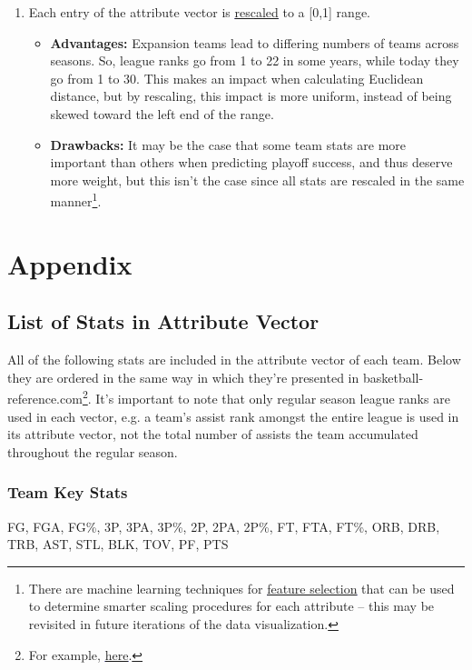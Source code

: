 \documentclass[a4paper,11pt]{article}
\begin{document}
\begin{enumerate}
\item Each entry of the attribute vector is \textcolor{blue}{\underline{\href{http://en.wikipedia.org/wiki/Feature_scaling\#Methods}{rescaled}}} to a [0,1] range. 
\begin{itemize}
\item \textbf{Advantages:} Expansion teams lead to differing numbers of teams across seasons. So, league ranks go from 1 to 22 in some years, while today they go from 1 to 30. This makes an impact when calculating Euclidean distance, but by rescaling, this impact is more uniform, instead of being skewed toward the left end of the range. 
\item \textbf{Drawbacks:} It may be the case that some team stats are more important than others when predicting playoff success, and thus deserve more weight, but this isn't the case since all stats are rescaled in the same manner\footnote{There are machine learning techniques for \textcolor{blue}{\underline{\href{http://en.wikipedia.org/wiki/Feature_selection}{feature selection}}} that can be used to determine smarter scaling procedures for each attribute -- this may be revisited in future iterations of the data visualization.}.
\end{itemize}
 
\end{enumerate}


\section{Appendix}
\subsection{List of Stats in Attribute Vector}
	All of the following stats are included in the attribute vector of each team. Below they are ordered in the same way in which they're presented in basketball-reference.com\footnote{For example, \textcolor{blue}{\underline{\href{http://www.basketball-reference.com/teams/BOS/2014.html\#all_team_stats}{here}}}.}. It's important to note that only regular season league ranks are used in each vector, e.g. a team's assist rank amongst the entire league is used in its attribute vector, not the total number of assists the team accumulated throughout the regular season.												

\subsubsection{Team Key Stats}
FG, FGA, FG\%, 3P, 3PA, 3P\%, 2P, 2PA, 2P\%, FT, FTA, FT\%, ORB, DRB, TRB, AST, STL, BLK, TOV, PF, PTS
\end{document}
